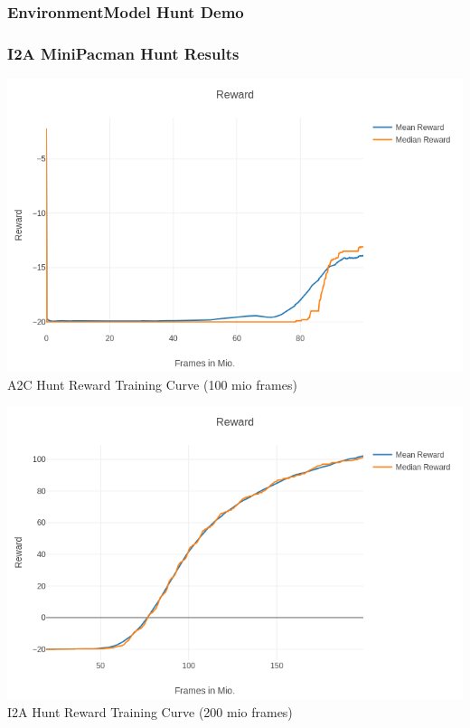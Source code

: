 \begin{frame}
    \frametitle{EnvironmentModel Hunt Demo}
    
\end{frame}
\clearpage




\begin{frame}
    \frametitle{I2A MiniPacman Hunt Results}

\begin{multicols}{2}
	\begin{center}
    \includegraphics[width=\columnwidth]{./Images/a2c_hunt_reward.png}\\
	A2C Hunt Reward Training Curve (100 mio frames)
	\end{center}
    \vfill\columnbreak
	\begin{center}
    \includegraphics[width=\columnwidth]{./Images/i2a_hunt_reward_mean_and_median.png}\\
	I2A Hunt Reward Training Curve (200 mio frames)
	\end{center}
\end{multicols}
\end{frame}
\clearpage

